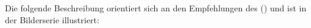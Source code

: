 {%
Die folgende Beschreibung orientiert sich an den 
Empfehlungen des  () 
und ist in der Bilderserie  illustriert:
}
